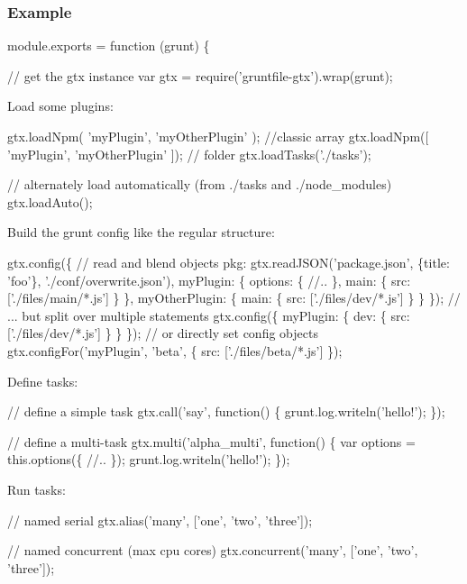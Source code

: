 \subsubsection*{Example}


\begin{DoxyCode}
module.exports = function (grunt) \{

    // get the gtx instance
    var gtx = require('gruntfile-gtx').wrap(grunt);
\end{DoxyCode}


Load some plugins\+: 
\begin{DoxyCode}
gtx.loadNpm(
    'myPlugin',
    'myOtherPlugin'
);
//classic array
gtx.loadNpm([
    'myPlugin',
    'myOtherPlugin'
]);
// folder
gtx.loadTasks('./tasks');

// alternately load automatically (from ./tasks and ./node\_modules)
gtx.loadAuto();
\end{DoxyCode}


Build the grunt config like the regular structure\+: 
\begin{DoxyCode}
gtx.config(\{
    // read and blend objects
    pkg: gtx.readJSON('package.json', \{title: 'foo'\}, './conf/overwrite.json'),
    myPlugin: \{
        options: \{
            //..
        \},
        main: \{
            src: ['./files/main/*.js']
        \}
    \},
    myOtherPlugin: \{
        main: \{
            src: ['./files/dev/*.js']
        \}
    \}
\});
// ... but split over multiple statements
gtx.config(\{
    myPlugin: \{
        dev: \{
            src: ['./files/dev/*.js']
        \}
    \}
\});
// or directly set config objects
gtx.configFor('myPlugin', 'beta', \{
    src: ['./files/beta/*.js']
\});
\end{DoxyCode}


Define tasks\+: 
\begin{DoxyCode}
// define a simple task
gtx.call('say', function() \{
    grunt.log.writeln('hello!');
\});

// define a multi-task
gtx.multi('alpha\_multi', function() \{
    var options = this.options(\{
        //..
    \});
    grunt.log.writeln('hello!');
\});
\end{DoxyCode}


Run tasks\+: 
\begin{DoxyCode}
// named serial
gtx.alias('many', ['one', 'two', 'three']);

// named concurrent (max cpu cores)
gtx.concurrent('many', ['one', 'two', 'three']);
\end{DoxyCode}


